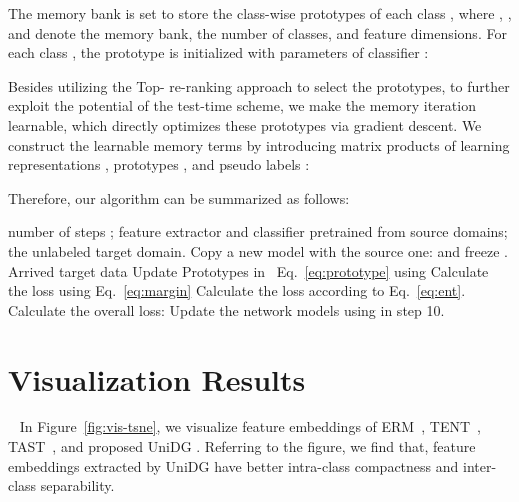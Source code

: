 \documentclass{article} \usepackage{iclr2024_conference,times}
\def\Model{UniDG }
\begin{document}
The memory bank is set to store the class-wise prototypes of each class , where , , and  denote the memory bank, the number of classes, and feature dimensions. For each class , the prototype  is initialized with parameters of classifier :

Besides utilizing the Top- re-ranking approach to select the prototypes, to further exploit the potential of the test-time scheme, we make the memory iteration learnable, which directly optimizes these prototypes via gradient descent. We construct the learnable memory terms by introducing matrix products of learning representations , prototypes , and pseudo labels :

Therefore, our algorithm can be summarized as follows:
\begin{algorithm}[ht]
	\caption{\Model Algorithm}
	\begin{algorithmic}[1]
		\REQUIRE number of steps ; feature extractor  and classifier  pretrained from source domains; the unlabeled target domain.
		\STATE 
		\STATE Copy a new model with the source one:  and freeze .
\FOR{}
		\STATE 
		\STATE Arrived target data 
		\STATE Update Prototypes  in ~Eq.~\ref{eq:prototype} using 
		\STATE Calculate the loss  using Eq.~\ref{eq:margin}
		\STATE Calculate the loss  according to Eq.~\ref{eq:ent}.
		\STATE Calculate the overall loss: 
		\STATE Update the network models  using  in step 10.
		\ENDFOR
	\end{algorithmic}
	\label{alg}
\end{algorithm}




\section{Visualization Results}~\label{sec:vis}
In Figure~\ref{fig:vis-tsne}, we visualize feature embeddings of ERM~\cite{vapnik1998statistical}, TENT~\cite{wang2020tent}, TAST~\cite{jang2022test}, and proposed \Model. Referring to the figure, we find that, feature embeddings extracted by \Model have better intra-class compactness and inter-class separability.
\end{document}
